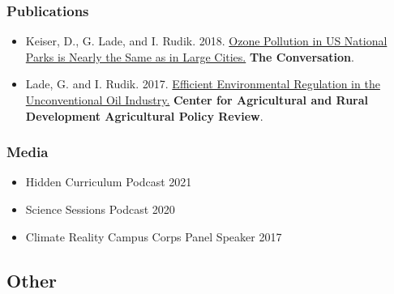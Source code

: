 \documentclass[11pt]{res} %
\begin{document}
\begin{resume}
\subsubsection{Publications}
\begin{itemize} %
	\item[] Keiser, D., G. Lade, and I. Rudik. 2018. \href{https://theconversation.com/ozone-pollution-in-us-national-parks-is-nearly-the-same-as-in-large-cities-100148}{Ozone Pollution in US National Parks is Nearly the Same as in Large Cities.} \textbf{The Conversation}.
	\item[] Lade, G. and I. Rudik. 2017. \href{https://www.card.iastate.edu/ag_policy_review/display.aspx?id=70}{Efficient Environmental Regulation in the Unconventional Oil Industry.} \textbf{Center for Agricultural and Rural Development Agricultural Policy Review}.
\end{itemize}

\vspace{-.2in}

\subsubsection{Media}
\begin{itemize} %
	\item[] Hidden Curriculum Podcast \hfill 2021
	\item[] Science Sessions Podcast \hfill 2020
	\item[] Climate Reality Campus Corps Panel Speaker \hfill 2017
\end{itemize}
\subsection{Other}


\end{resume}
\end{document}
